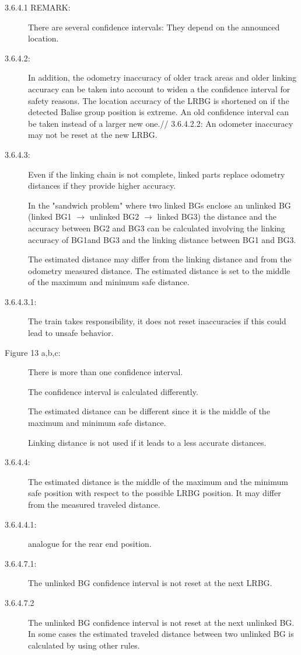 \begin{description}
\item[3.6.4.1 REMARK:] There are several confidence intervals: They depend on the announced location.
\item[3.6.4.2:] In addition, the odometry inaccuracy of older track areas and older linking accuracy can be taken into account to widen a the confidence interval for safety reasons. The location accuracy of the LRBG is shortened on if the detected Balise group position is extreme. An old confidence interval can be taken instead of a larger new one.//
3.6.4.2.2: An odometer inaccuracy may not be reset at the new LRBG.
\item[3.6.4.3:] Even if the linking chain is not complete, linked parts replace odometry distances if they provide higher accuracy.

In the "sandwich problem" where two linked BGs enclose an unlinked BG 
(linked BG1 $\rightarrow$ unlinked BG2 $\rightarrow$ linked BG3) 
the distance and the accuracy between BG2 and BG3 can be calculated involving the linking accuracy of BG1and BG3 and the linking distance between BG1 and BG3. 

The estimated distance may differ from the linking distance and from the odometry measured distance. The estimated distance is set to the middle of the maximum and minimum safe distance.

\item[3.6.4.3.1:]
The train takes responsibility, it does not reset inaccuracies if this could lead to unsafe behavior. 
\item[Figure 13 a,b,c:]
There is more than one confidence interval.

The confidence interval is calculated differently.

The estimated distance can be different since it is the middle of the maximum and minimum safe distance.

Linking distance is not used if it leads to a less accurate distances.

\item[3.6.4.4:]
The estimated distance is the middle of the maximum and the minimum safe position with respect to the possible LRBG position. It may differ from the measured traveled distance.

\item[3.6.4.4.1:]
analogue for the rear end position.

\item[3.6.4.7.1:]
The unlinked BG confidence interval is not reset at the next LRBG.

\item[3.6.4.7.2]
The unlinked BG confidence interval is not reset at the next unlinked BG. In some cases the estimated traveled distance between two unlinked BG is calculated by using other rules.
\end{description}

